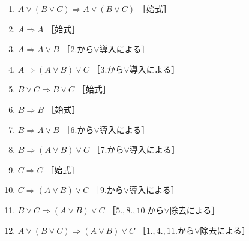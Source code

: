 \begin{description}
  \begin{enumerate}[1. ]
    \item $A \lor ( B \lor C) \Longrightarrow A \lor (B \lor C)$
           \quad ［始式］
    \item $A \Longrightarrow A$ \quad ［始式］
    \item $A \Longrightarrow A \lor B$ \quad ［2.から$\lor$導入による］
    \item $A \Longrightarrow (A \lor B ) \lor C$ \quad ［3.から$\lor$導入による］
    \item $B \lor C \Longrightarrow B \lor C$ \quad ［始式］
    \item $B \Longrightarrow B$ \quad ［始式］
    \item $B \Longrightarrow A \lor B$ \quad ［6.から$\lor$導入による］
    \item $B \Longrightarrow ( A \lor B) \lor C$ \quad ［7.から$\lor$導入による］
    \item $C \Longrightarrow C$ \quad ［始式］
    \item $C \Longrightarrow (A \lor B ) \lor C$ \quad ［9.から$\lor$導入による］
    \item $B \lor C \Longrightarrow (A \lor B ) \lor C$
           \quad ［$5., 8., 10.$から$\lor$除去による］
    \item $A \lor ( B \lor C) \Longrightarrow (A \lor B ) \lor C$
           \quad ［$1., 4., 11.$から$\lor$除去による］
  \end{enumerate}


\end{description}
